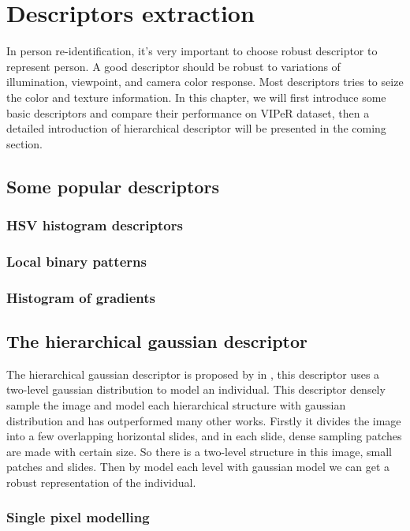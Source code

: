 \chapter{Descriptors extraction}
In person re-identification, it's very important to choose robust descriptor to represent person. A good descriptor should be robust to variations of illumination, viewpoint, and camera color response. Most descriptors tries to seize the color and texture information. In this chapter, we will first introduce some basic descriptors and compare their performance on VIPeR dataset, then a detailed introduction of hierarchical descriptor will be presented in the coming section.


\section{Some popular descriptors}
\subsection{HSV histogram descriptors}


\subsection{Local binary patterns}

\subsection{Histogram of gradients}

\section{The hierarchical gaussian descriptor}

The hierarchical gaussian descriptor is proposed by in  \cite{GOGpaper}, this descriptor uses a two-level gaussian distribution to model an individual. This descriptor densely sample the image and model each hierarchical structure with gaussian distribution and has outperformed many other works. Firstly it divides the image into a few overlapping horizontal slides, and in each slide, dense sampling patches are made with certain size. So there is a  two-level structure in this image, small patches and slides. Then by model each level with gaussian model we can get a robust representation of the individual.
\subsection{Single pixel modelling}

